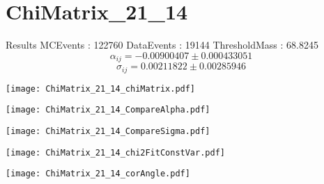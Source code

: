 \documentclass[a4paper,12pt]{article}
\begin{document}
\section{ChiMatrix\_21\_14}
\begin{minipage}{0.49\linewidth} Results \newline
MCEvents : 122760\newline
DataEvents : 19144 \newline
ThresholdMass : 68.8245\\
$$\alpha_{ij} = -0.00900407\pm 0.000433051$$
$$\sigma_{ij} = 0.00211822\pm 0.00285946$$
\end{minipage}\hfill
\begin{minipage}{0.49\linewidth} 
\texttt{[image: ChiMatrix\_21\_14\_chiMatrix.pdf]}\\
\end{minipage}
\hfill
\begin{minipage}{0.49\linewidth} 
\texttt{[image: ChiMatrix\_21\_14\_CompareAlpha.pdf]}\\
\end{minipage}
\hfill
\begin{minipage}{0.49\linewidth} 
\texttt{[image: ChiMatrix\_21\_14\_CompareSigma.pdf]}\\
\end{minipage}
\begin{minipage}{0.49\linewidth} 
\texttt{[image: ChiMatrix\_21\_14\_chi2FitConstVar.pdf]}\\
\end{minipage}
\hfill
\begin{minipage}{0.49\linewidth} 
\texttt{[image: ChiMatrix\_21\_14\_corAngle.pdf]}\\
\end{minipage}
\end{document}
